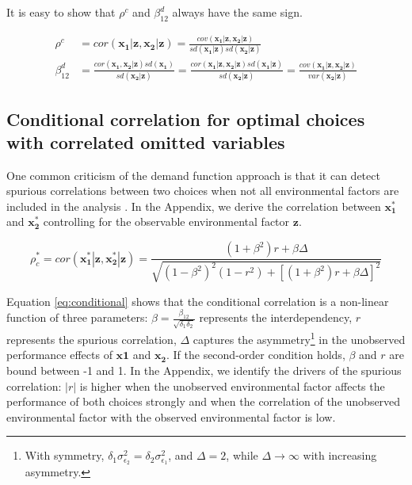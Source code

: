 \documentclass[12pt]{article}
\begin{document}
It is easy to show that \(\rho^c\) and \(\beta^d_{12}\) always have the
same sign.

\begin{align}\label{eq:coefficient}
\rho^c &= cor(\mathbf{x_1}|\mathbf{z}, \mathbf{x_2}|\mathbf{z}) =
\frac{
      cov(\mathbf{x_1}|\mathbf{z},\mathbf{x_2}|\mathbf{z})
      }{
      sd(\mathbf{x_1}|\mathbf{z}) sd(\mathbf{x_2}|\mathbf{z})
      } \nonumber \\
\beta^d_{12} &=
\frac{
      cor(\mathbf{x_1}, \mathbf{x_2}|\mathbf{z}) sd(\mathbf{x_1})
      }{
      sd(\mathbf{x_2} | \mathbf{z})
      }
      =
 \frac{
      cor(\mathbf{x_1}|\mathbf{z}, \mathbf{x_2}|\mathbf{z})
      sd(\mathbf{x_1} | \mathbf{z})
      }{
      sd(\mathbf{x_2} | \mathbf{z})
      }
      =
\frac{
     cov(\mathbf{x_1}|\mathbf{z}, \mathbf{x_2}|\mathbf{z})
     }{
     var(\mathbf{x_2} | \mathbf{z})
     }
\end{align}

\subsection{Conditional correlation for optimal choices with correlated
omitted
variables}\label{conditional-correlation-for-optimal-choices-with-correlated-omitted-variables}

One common criticism of the demand function approach is that it can
detect spurious correlations between two choices when not all
environmental factors are included in the analysis \citep{Grabner2013}.
In the Appendix, we derive the correlation between \(\mathbf{x^*_1}\)
and \(\mathbf{x^*_2}\) controlling for the observable environmental
factor \(\mathbf{z}\).

\begin{equation} \label{eq:conditional}
\rho^*_c = cor(\mathbf{x_1^*|z, x_2^*|z}) =
\frac{
  (1 + \beta^2) r + \beta \Delta
}{
\sqrt{
  (1 - \beta^2)^2 (1 - r^2)
  + [(1 + \beta^2) r + \beta \Delta] ^ 2
}}
\end{equation}

Equation \eqref{eq:conditional} shows that the conditional correlation
is a non-linear function of three parameters:
\(\beta = \frac{\beta_{12}}{\sqrt{\delta_1\delta_2}}\) represents the
interdependency, \(r\) represents the spurious correlation, \(\Delta\)
captures the asymmetry\footnote{With symmetry,
  \(\delta_1 \sigma^2_{\epsilon_2} = \delta_2 \sigma^2_{\epsilon_1}\),
  and \(\Delta =2\), while \(\Delta \to \infty\) with increasing
  asymmetry.} in the unobserved performance effects of \(\mathbf{x1}\)
and \(\mathbf{x_2}\). If the second-order condition holds, \(\beta\) and
\(r\) are bound between -1 and 1. In the Appendix, we identify the
drivers of the spurious correlation: \(|r|\) is higher when the
unobserved environmental factor affects the performance of both choices
strongly and when the correlation of the unobserved environmental factor
with the observed environmental factor is low.
\end{document}
